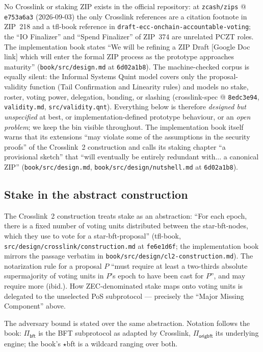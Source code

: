 \documentclass[11pt,a4paper]{article}
\theoremstyle{definition}
\begin{document}
No Crosslink or staking ZIP exists in the official repository: at
\texttt{zcash/zips} @ \texttt{e753a6a3} (2026-09-03) the only Crosslink
references are a citation footnote in
ZIP~218 and a tfl-book reference in
\texttt{draft-ecc-onchain-accountable-voting}; the ``IO Finalizer'' and
``Spend Finalizer'' of ZIP~374 are unrelated PCZT roles. The implementation
book states ``We will be refining a ZIP Draft [Google Doc link] which will
enter the formal ZIP process as the prototype approaches maturity''
(\texttt{book/src/design.md} at \texttt{6d02a1b8}). The machine-checked
corpus is equally silent: the Informal Systems Quint model covers only the
proposal-validity function (Tail Confirmation and Linearity rules) and
models no stake, roster, voting power, delegation, bonding, or slashing
(crosslink-spec @ \texttt{8edc3e94}, \texttt{validity.md},
\texttt{src/validity.qnt}).
Everything below is therefore \emph{designed but unspecified} at best, or
implementation-defined prototype behaviour, or an \emph{open problem}; we
keep the bin visible throughout. The implementation book itself warns that
its extensions ``may violate some of the assumptions in the security
proofs'' of the Crosslink~2 construction and calls its staking chapter ``a
provisional sketch'' that ``will eventually be entirely redundant with...
a canonical ZIP'' (\texttt{book/src/design.md},
\texttt{book/src/design/nutshell.md} at \texttt{6d02a1b8}).

\subsection{Stake in the abstract construction}\label{sec:xl-stake-abstract}

The Crosslink~2 construction treats stake as an abstraction: ``For each
epoch, there is a fixed number of voting units distributed between the
star-bft-nodes, which they use to vote for a star-bft-proposal''
(tfl-book, \texttt{src/design/crosslink/construction.md} at
\texttt{fe6e1d6f}; the implementation book mirrors the passage verbatim in
\texttt{book/src/design/cl2-construction.md}). The notarization rule for a
proposal $P$ ``must require at least a two-thirds absolute supermajority
of voting units in $P$'s epoch to have been cast for $P$'', and may
require more (ibid.). How ZEC-denominated stake maps onto voting units is
delegated to the unselected PoS subprotocol --- precisely the ``Major
Missing Component'' above.

The adversary bound is stated over the same abstraction. Notation follows
the book: $\Pi_{\mathsf{bft}}$ is the BFT subprotocol as adapted by
Crosslink, $\Pi_{\mathsf{origbft}}$ its underlying engine; the book's
$\star$bft is a wildcard ranging over both.
\end{document}
